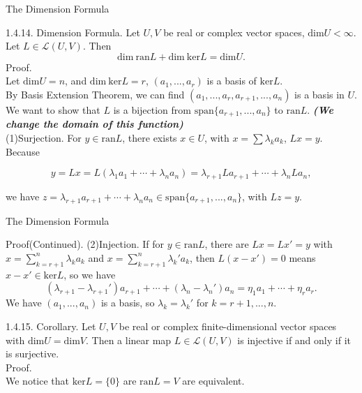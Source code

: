 \documentclass[hyperref={pdfpagelabels=true}]{beamer}
\newcommand{\highlightr}[1]{\textcolor[rgb]{1,0.3,0.2}{\emph{\textbf{#1}}}}
\newcommand{\structb}[1]{\textcolor[rgb]{0.2,0.2,0.7}{#1}}
\newcommand{\<}{\langle}
\renewcommand{\>}{\rangle}
\begin{document}
\begin{frame}{The Dimension Formula}
    \begin{block}{1.4.14. Dimension Formula.}
        Let $U,V$ be real or complex vector spaces, $\text{dim}U < \infty$. Let $L \in \mathcal{L}(U,V)$. Then 
        \[\text{dim}\ \text{ran}L+\text{dim}\ \text{ker}L = \text{dim}U.\]
    \structb{Proof.}\\
        Let $\text{dim}U = n$, and $\text{dim}\ \text{ker}L = r$, $(a_{1},...,a_{r})$ is a basis of $\text{ker}L$.\\
        By Basis Extension Theorem, we can find $(a_{1},...,a_{r},a_{r+1},...,a_{n})$ is a basis in $U$.\\
        We want to show that $L$ is a bijection from $\text{span}\{a_{r+1},...,a_{n}\}$ to $\text{ran}L$. \highlightr{(We change the domain of this function)}\\
        \structb{(1)Surjection.} For $y \in \text{ran}L$, there exists $x \in U$, with $x = \sum \lambda_{k}a_{k}$, $Lx = y$. Because 
        \begin{spacing}{0.7} 
        \[
            y = Lx = L(\lambda_{1}a_{1}+\cdots+\lambda_{n}a_{n}) = \lambda_{r+1}La_{r+1}+ \cdots +\lambda_{n}La_{n},
        \]
        \end{spacing}
        we have $z = \lambda_{r+1}a_{r+1}+\cdots+\lambda_{n}a_{n} \in \text{span}\{a_{r+1},...,a_{n}\}$, with $Lz = y$. 
    \end{block}
\end{frame}
\begin{frame}{The Dimension Formula}
    \begin{block}{Proof(Continued).}
        \structb{(2)Injection.} If for $y \in \text{ran}L$, there are $Lx = Lx' = y$ with $x = \sum_{k = r+1}^{n} \lambda_{k}a_{k}$ and $x = \sum_{k = r+1}^{n} \lambda_{k}'a_{k}$, then $L(x-x') = 0$ means $x-x' \in \text{ker}L$, so we have
        \[(\lambda_{r+1}-\lambda_{r+1}')a_{r+1}+\cdots+(\lambda_{n}-\lambda_{n}')a_{n} = \eta_{1}a_{1}+\cdots+\eta_{r}a_{r}.\]
        We have $(a_{1},...,a_{n})$ is a basis, so $\lambda_{k} = \lambda_{k}'$ for $k = r+1,...,n$.
    \end{block}
    \begin{block}{1.4.15. Corollary.}
        Let $U,V$ be real or complex finite-dimensional vector spaces with $\text{dim}U = \text{dim}V$. Then a linear map $L \in \mathcal{L}(U,V)$ is injective if and only if it is surjective.\\
    \structb{Proof.}\\
       We notice that $\text{ker}L = \{0\}$ are $\text{ran}L = V$ are equivalent.
    \end{block}
\end{frame}
\end{document}
